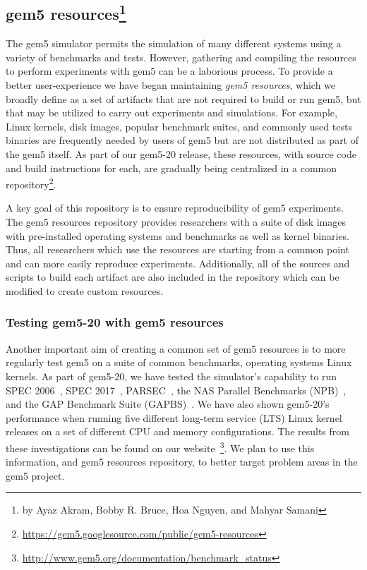 \subsection[gem5 resources]{gem5 resources\footnote{by Ayaz Akram, Bobby R. Bruce, Hoa Nguyen, and Mahyar Samani}}
\label{sec:resources}

The gem5 simulator permits the simulation of many different systems
using a variety of benchmarks and tests.
However, gathering and compiling the resources to perform experiments with gem5 can be a laborious process.
To provide a better user-experience we have began maintaining \emph{gem5 resources}, which we broadly define as a set of artifacts that are not required to build or run gem5, but that may be utilized to carry out experiments and simulations.
For example, Linux kernels, disk images, popular benchmark suites, and commonly used tests binaries are frequently needed by users of gem5 but are not distributed as part of the gem5 itself.
As part of our gem5-20 release, these resources, with source code and build instructions for each, are gradually being centralized in a common repository\footnote{\url{https://gem5.googlesource.com/public/gem5-resources}}.

A key goal of this repository is to ensure reproducibility of gem5 experiments.
The gem5 resources repository provides researchers with a suite of disk images with pre-installed operating systems and benchmarks as well as kernel binaries.
Thus, all researchers which use the resources are starting from a common point and can more easily reproduce experiments.
Additionally, all of the sources and scripts to build each artifact are also included in the repository which can be modified to create custom resources.

\subsubsection{Testing gem5-20 with gem5 resources}

Another important aim of creating a common set of gem5 resources is to more regularly test gem5 on a suite of common benchmarks, operating systems Linux kernels.
As part of gem5-20, we have tested the simulator's capability to run SPEC 2006~\cite{spec06}, SPEC 2017~\cite{spec17}, PARSEC~\cite{parsec}, the NAS Parallel Benchmarks (NPB)~\cite{npb}, and the GAP Benchmark Suite (GAPBS)~\cite{gapbs}.
We have also shown gem5-20's performance when running five different long-term service (LTS) Linux kernel releases on a set of different CPU and memory configurations.
The results from these investigations can be found on our website~\footnote{\url{http://www.gem5.org/documentation/benchmark_status}}.
We plan to use this information, and gem5 resources repository, to better target problem areas in the gem5 project.

